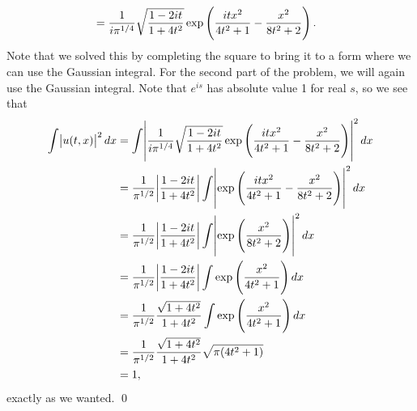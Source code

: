 \documentclass{article}
\begin{document}
\begin{enumerate}[(a)]
\begin{align*}
        &= \frac{1}{i\pi^{1/4}}\sqrt{\frac{1-2it}{1+4t^2}} \exp\del{\frac{itx^2}{4t^2+1} - \frac{x^2}{8t^2+2}}.
    \end{align*}
    Note that we solved this by completing the square to bring it to a form where we can use the Gaussian integral. 
    \hop
    For the second part of the problem, we will again use the Gaussian integral. Note that $e^{is}$ has absolute value 1 for real $s$, so we see that 
    \begin{align*}
        \int \abs{u(t,x)}^2 dx&=  \int \abs{\frac{1}{i\pi^{1/4}}\sqrt{\frac{1-2it}{1+4t^2}} \exp\del{\frac{itx^2}{4t^2+1} - \frac{x^2}{8t^2+2}}}^2dx \\
        &= \frac{1}{\pi^{1/2}}\abs{\frac{1-2it}{1+4t^2}}\int \abs{ \exp\del{\frac{itx^2}{4t^2+1} - \frac{x^2}{8t^2+2}}}^2dx \\
        &= \frac{1}{\pi^{1/2}}\abs{\frac{1-2it}{1+4t^2}}\int \abs{ \exp\del{\frac{x^2}{8t^2+2}}}^2dx \\
        &= \frac{1}{\pi^{1/2}}\abs{\frac{1-2it}{1+4t^2}}\int \exp\del{\frac{x^2}{4t^2+1}}dx \\
        &= \frac{1}{\pi^{1/2}}\frac{\sqrt{1+4t^2}}{1+4t^2}\int \exp\del{\frac{x^2}{4t^2+1}}dx\\
        &= \frac{1}{\pi^{1/2}}\frac{\sqrt{1+4t^2}}{1+4t^2}\sqrt{\pi (4t^2 + 1)}\\
        &= 1,
    \end{align*}
    exactly as we wanted. \qed
\end{enumerate}
\end{document}

